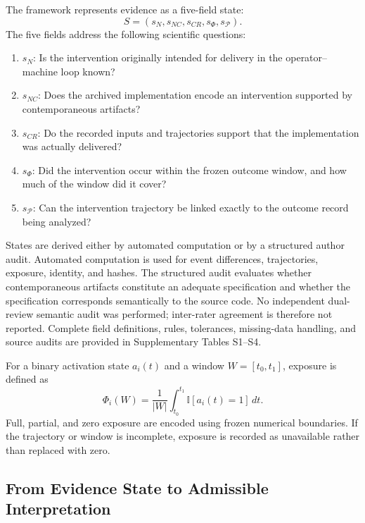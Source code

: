 \documentclass[journal]{IEEEtran}
\begin{document}
The framework represents evidence as a five-field state:
\begin{equation}
S=(s_N,s_{NC},s_{CR},s_{\Phi},s_{\mathcal{P}}).
\label{eq:evidence_state}
\end{equation}
The five fields address the following scientific questions:
\begin{enumerate}
    \item $s_N$: Is the intervention originally intended for delivery in the
    operator--machine loop known?
    \item $s_{NC}$: Does the archived implementation encode an intervention
    supported by contemporaneous artifacts?
    \item $s_{CR}$: Do the recorded inputs and trajectories support that the
    implementation was actually delivered?
    \item $s_{\Phi}$: Did the intervention occur within the frozen outcome
    window, and how much of the window did it cover?
    \item $s_{\mathcal{P}}$: Can the intervention trajectory be linked exactly
    to the outcome record being analyzed?
\end{enumerate}

States are derived either by automated computation or by a structured author
audit. Automated computation is used for event differences, trajectories,
exposure, identity, and hashes. The structured audit evaluates whether
contemporaneous artifacts constitute an adequate specification and whether
the specification corresponds semantically to the source code. No independent
dual-review semantic audit was performed; inter-rater agreement is therefore
not reported. Complete field definitions, rules, tolerances, missing-data
handling, and source audits are provided in Supplementary Tables S1--S4.

For a binary activation state $a_i(t)$ and a window $W=[t_0,t_1]$, exposure is
defined as
\begin{equation}
\Phi_i(W)=\frac{1}{|W|}\int_{t_0}^{t_1}\mathbb{I}[a_i(t)=1]\,dt.
\label{eq:exposure}
\end{equation}
Full, partial, and zero exposure are encoded using frozen numerical
boundaries. If the trajectory or window is incomplete, exposure is recorded
as unavailable rather than replaced with zero.

\subsection{From Evidence State to Admissible Interpretation}
\end{document}
